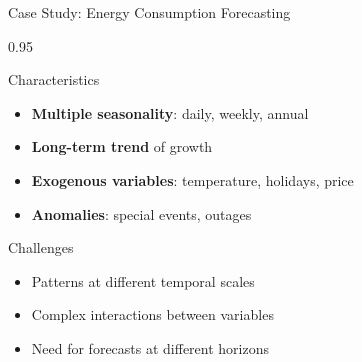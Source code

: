 \documentclass[9pt, aspectratio=169, t]{beamer}
\begin{document}
\begin{frame}{Case Study: Energy Consumption Forecasting}
    \begin{cminipage}{0.95\textwidth}
    \begin{block}{Characteristics}
        \begin{itemize}\setlength{\itemsep}{0pt}
            \item \textbf{Multiple seasonality}: daily, weekly, annual
            \item \textbf{Long-term trend} of growth
            \item \textbf{Exogenous variables}: temperature, holidays, price
            \item \textbf{Anomalies}: special events, outages
        \end{itemize}
    \end{block}
    \vspace{0.1cm}
    \begin{alertblock}{Challenges}
        \begin{itemize}\setlength{\itemsep}{0pt}
            \item Patterns at different temporal scales
            \item Complex interactions between variables
            \item Need for forecasts at different horizons
        \end{itemize}
    \end{alertblock}
    \end{cminipage}
\end{frame}
\end{document}
